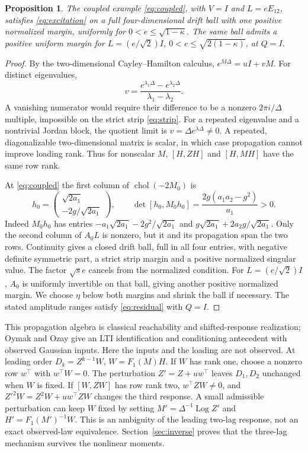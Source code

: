\documentclass[11pt,a4paper]{amsart}
\theoremstyle{plain}
\newtheorem{proposition}[theorem]{Proposition}
\theoremstyle{definition}
\theoremstyle{remark}
\DeclareMathOperator{\chol}{chol}
\DeclareMathOperator{\Log}{Log}
\begin{document}
\begin{proposition}\label{prop:rank-one}
The coupled example \eqref{eq:coupled}, with $V=I$ and $L=eE_{12}$,
satisfies \eqref{eq:excitation} on a full four-dimensional drift ball with
one positive normalized margin, uniformly for
$0<e\le\sqrt{1-\kappa}$. The same ball admits a positive uniform margin
for $L=(e/\sqrt2)I$, $0<e\le\sqrt{2(1-\kappa)}$, at $Q=I$.
\end{proposition}
\begin{proof}
By the two-dimensional Cayley--Hamilton calculus,
$e^{M\Delta}=uI+vM$. For distinct eigenvalues,
\[
 v=\frac{e^{\lambda_1\Delta}-e^{\lambda_2\Delta}}
          {\lambda_1-\lambda_2}.
\]
A vanishing numerator would require their difference to be a nonzero
$2\pi i/\Delta$ multiple, impossible on the strict strip
\eqref{eq:strip}. For a repeated eigenvalue and a nontrivial Jordan block,
the quotient limit is $v=\Delta e^{\lambda\Delta}\ne0$. A repeated,
diagonalizable two-dimensional matrix is scalar, in which case propagation
cannot improve loading rank. Thus for nonscalar $M$,
$[H,ZH]$ and $[H,MH]$ have the same row rank.

At \eqref{eq:coupled} the first column of $\chol(-2M_0)$ is
\[
 h_0=\begin{pmatrix}\sqrt{2a_1}\\-2g/\sqrt{2a_1}\end{pmatrix},
 \qquad
 \det[h_0,M_0h_0]=\frac{2g(a_1a_2-g^2)}{a_1}>0.
\]
Indeed $M_0h_0$ has entries
$-a_1\sqrt{2a_1}-2g^2/\sqrt{2a_1}$ and
$g\sqrt{2a_1}+2a_2g/\sqrt{2a_1}$.
Only the second column of $A_0L$ is nonzero, but it and its propagation
span the two rows. Continuity gives a closed drift ball, full in all four
entries, with negative definite symmetric part, a strict strip margin and
a positive normalized singular value. The factor $\sqrt{s}e$ cancels
from the normalized condition. For $L=(e/\sqrt2)I$, $A_0$ is uniformly
invertible on that ball, giving another positive normalized margin.
We choose $\eta$ below both margins and shrink the ball if necessary. The stated
amplitude ranges satisfy \eqref{eq:residual} with $Q=I$.
\end{proof}

This propagation algebra is classical reachability and shifted-response
realization; Oymak and Ozay \cite{OymakOzay2019} give an LTI identification
and conditioning antecedent with observed Gaussian inputs. Here the inputs
and the loading are not observed. At leading order $D_k=Z^{k-1}W$,
$W=F_1(M)H$. If $W$ has rank one, choose
a nonzero row $w^\top$ with $w^\top W=0$. The perturbation
$Z'=Z+uw^\top$ leaves $D_1,D_2$ unchanged when $W$ is fixed. If
$[W,ZW]$ has row rank two, $w^\top ZW\ne0$, and
$Z'^2W=Z^2W+uw^\top ZW$ changes the third response. A small admissible
perturbation can keep $W$ fixed by setting
$M'=\Delta^{-1}\Log Z'$ and $H'=F_1(M')^{-1}W$.
This is an ambiguity of the leading two-lag response, not an exact
observed-law equivalence. Section~\ref{sec:inverse} proves that the
three-lag mechanism survives the nonlinear moments.
\end{document}
